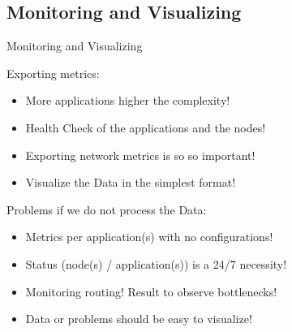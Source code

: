 \subsection{Monitoring and Visualizing}\label{subsec:minimal-requirements-monitoring}
\begin{frame}{Monitoring and Visualizing}
	\begin{alertblock}{Exporting metrics:}
		\begin{itemize}
			\item<1-| alert@1> More applications \alert{higher the complexity}!
			\item<2-| alert@2> \alert{Health Check} of the applications and the nodes!
			\item<3-| alert@3> Exporting \alert{network metrics} is so so important!
			\item<4-| alert@4> \alert{Visualize the Data} in the simplest format!
		\end{itemize}	
	\end{alertblock}
	\begin{exampleblock}{Problems if we do not process the Data:}
		\begin{itemize}
			\item<1-| alert@1> \alert{Metrics} per application(s) with \alert{no configurations}! 
			\item<2-| alert@2> Status (\alert{node(s) / application(s)}) is a \alert{24/7 necessity}!
			\item<3-| alert@3> \alert{Monitoring routing}! Result to observe \alert{bottlenecks}!
			\item<4-| alert@4> Data or problems should be easy to \alert{visualize}!
		\end{itemize}	
	\end{exampleblock}
\end{frame}